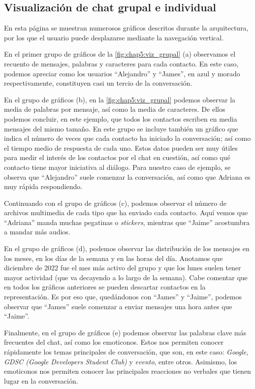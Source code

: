 \subsection{Visualización de chat grupal e individual}

En esta página se muestran numerosos gráficos descritos durante la arquitectura, por los que el usuario puede desplazarse mediante la navegación vertical.

En el primer grupo de gráficos de la \autoref{fig:chap5:viz_grupal} (a) observamos el recuento de mensajes, palabras y caracteres para cada contacto. En este caso, podemos apreciar como los usuarios ``Alejandro'' y ``James'', en azul y morado respectivamente, constituyen casi un tercio de la conversación.

En el grupo de gráficos (b), en la \autoref{fig:chap5:viz_grupal} podemos observar la media de palabras por mensaje, así como la media de caracteres. De ellos podemos concluir, en este ejemplo, que todos los contactos escriben en media mensajes del mismo tamaño. En este grupo se incluye también un gráfico que indica el número de veces que cada contacto ha iniciado la conversación; así como el tiempo medio de respuesta de cada uno. Estos datos pueden ser muy útiles para medir el interés de los contactos por el chat en cuestión, así como qué contacto tiene mayor iniciativa al diálogo. Para nuestro caso de ejemplo, se observa que ``Alejandro'' suele comenzar la conversación, así como que Adriana es muy rápida respondiendo.

Continuando con el grupo de gráficos (c), podemos observar el número de archivos multimedia de cada tipo que ha enviado cada contacto. Aquí vemos que ``Adriana'' manda muchas pegatinas o \textit{stickers}, mientras que ``Jaime'' acostumbra a mandar más audios.

En el grupo de gráficos (d), podemos observar las distribución de los mensajes en los meses, en los días de la semana y en las horas del día. Anotamos que diciembre de 2022 fue el mes más activo del grupo y que los lunes suelen tener mayor actividad (que va decayendo a lo largo de la semana). Cabe comentar que en todos los gráficos anteriores se pueden descartar contactos en la representación. Es por eso que, quedándonos con ``James'' y ``Jaime'', podemos observar que ``James'' suele comenzar a enviar mensajes una hora antes que ``Jaime''.

Finalmente, en el grupo de gráficos (e) podemos observar las palabras clave más frecuentes del chat, así como los emoticonos. Estos nos permiten conocer rápidamente los temas principales de conversación, que son, en este caso: \textit{Google}, \textit{GDSC (Google Developers Student Club)} y \textit{evento}, entre otros. Asimismo, los emoticonos nos permiten conocer las principales reacciones no verbales que tienen lugar en la conversación.

